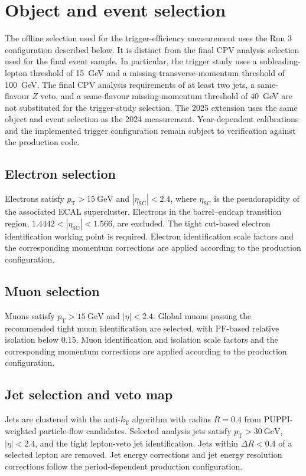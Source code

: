 \section{Object and event selection}\label{sec:selection}
The offline selection used for the trigger-efficiency measurement uses the Run 3 configuration described below.
It is distinct from the final CPV analysis selection used for the final event sample.
In particular, the trigger study uses a subleading-lepton threshold of 15~GeV and a missing-transverse-momentum threshold of 100~GeV.
The final CPV analysis requirements of at least two jets, a same-flavour $Z$ veto, and a same-flavour missing-momentum threshold of 40~GeV are not substituted for the trigger-study selection.
The 2025 extension uses the same object and event selection as the 2024 measurement.
Year-dependent calibrations and the implemented trigger configuration remain subject to verification against the production code.

\subsection{Electron selection}\label{sec:electron}
Electrons satisfy $p_{\mathrm T}>15~\mathrm{GeV}$ and $|\eta_{\mathrm{SC}}|<2.4$, where $\eta_{\mathrm{SC}}$ is the pseudorapidity of the associated ECAL supercluster.
Electrons in the barrel--endcap transition region, $1.4442<|\eta_{\mathrm{SC}}|<1.566$, are excluded.
The tight cut-based electron identification working point is required.
Electron identification scale factors and the corresponding momentum corrections are applied according to the production configuration.

\subsection{Muon selection}\label{sec:muon}
Muons satisfy $p_{\mathrm T}>15~\mathrm{GeV}$ and $|\eta|<2.4$.
Global muons passing the recommended tight muon identification are selected, with PF-based relative isolation below 0.15.
Muon identification and isolation scale factors and the corresponding momentum corrections are applied according to the production configuration.

\subsection{Jet selection and veto map}\label{sec:jet}
Jets are clustered with the anti-$k_{\mathrm T}$ algorithm with radius $R=0.4$ from PUPPI-weighted particle-flow candidates.
Selected analysis jets satisfy $p_{\mathrm T}>30~\mathrm{GeV}$, $|\eta|<2.4$, and the tight lepton-veto jet identification.
Jets within $\Delta R<0.4$ of a selected lepton are removed.
Jet energy corrections and jet energy resolution corrections follow the period-dependent production configuration.

